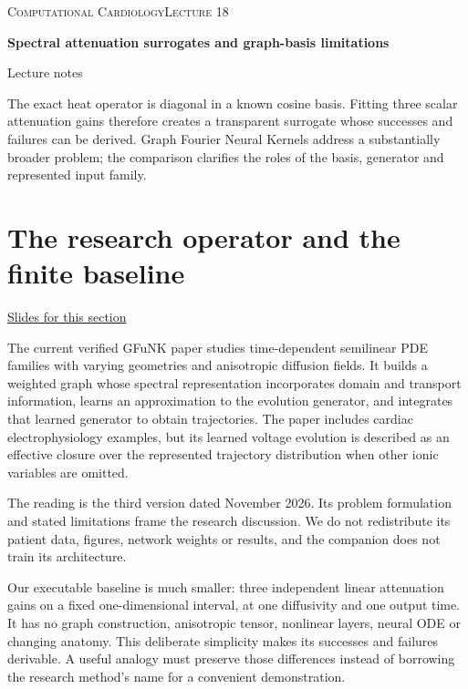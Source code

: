 \documentclass[11pt,letterpaper]{article}
\theoremstyle{definition}\newtheorem{definition}{Definition}\newtheorem{example}{Example}
\numberwithin{equation}{section}
\begin{document}
{\small\scshape Computational Cardiology\hfill Lecture 18}\par\medskip
{\raggedright{}\LARGE\bfseries\color{ink} Spectral attenuation surrogates and graph-basis limitations\par}\medskip
{\small Lecture notes}\par\bigskip
The exact heat operator is diagonal in a known cosine basis. Fitting three scalar attenuation gains therefore creates a transparent surrogate whose successes and failures can be derived. Graph Fourier Neural Kernels address a substantially broader problem; the comparison clarifies the roles of the basis, generator and represented input family.

\section{The research operator and the finite baseline}
\hypertarget{note-the-research-operator-and-the-finite-baseline}{}\label{note:the-research-operator-and-the-finite-baseline}
{\small \href{slides.html\#frame=a-three-parameter-fixed-time-map\&step=1}{Slides for this section}}\par
The current verified GFuNK paper studies time-dependent semilinear PDE families with varying geometries and anisotropic diffusion fields. It builds a weighted graph whose spectral representation incorporates domain and transport information, learns an approximation to the evolution generator, and integrates that learned generator to obtain trajectories. The paper includes cardiac electrophysiology examples, but its learned voltage evolution is described as an effective closure over the represented trajectory distribution when other ionic variables are omitted.

The reading is the third version dated November 2026. Its problem formulation and stated limitations frame the research discussion. We do not redistribute its patient data, figures, network weights or results, and the companion does not train its architecture.

Our executable baseline is much smaller: three independent linear attenuation gains on a fixed one-dimensional interval, at one diffusivity and one output time. It has no graph construction, anisotropic tensor, nonlinear layers, neural ODE or changing anatomy. This deliberate simplicity makes its successes and failures derivable. A useful analogy must preserve those differences instead of borrowing the research method's name for a convenient demonstration.
\end{document}
